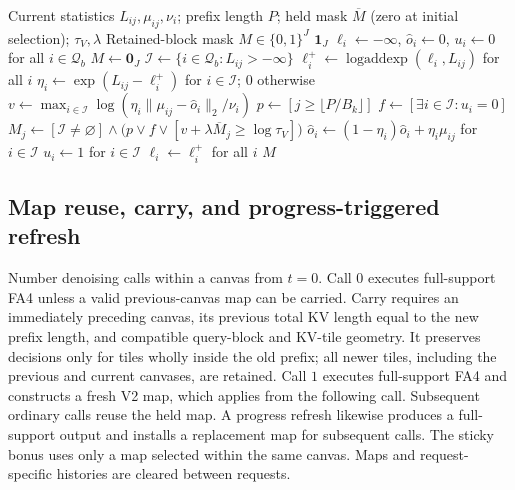 \documentclass[10pt]{article}
\begin{document}
\begin{algorithm}[t]
\caption{V2 selection for one layer, query head, and query block}
\label{alg:v2-selector}
\small
\begin{algorithmic}[1]
\Require Current statistics $L_{ij},\mu_{ij},\nu_i$; prefix length $P$;
held mask $\overline M$ (zero at initial selection); $\tau_V,\lambda$
\Ensure Retained-block mask $M\in\{0,1\}^{J}$
    \State \Return $\boldsymbol 1_J$ 
\EndIf
\State $\ell_i\gets-\infty$, $\widehat o_i\gets0$, $u_i\gets0$ for all $i\in\mathcal Q_b$
\State $M\gets\boldsymbol 0_J$
    \State $\mathcal I\gets\{i\in\mathcal Q_b:L_{ij}>-\infty\}$
    \State $\ell_i^+\gets\operatorname{logaddexp}(\ell_i,L_{ij})$ for all $i$
    \State $\eta_i\gets\exp(L_{ij}-\ell_i^+)$ for $i\in\mathcal I$; $0$ otherwise
    \State $v\gets\displaystyle\max_{i\in\mathcal I}
        \log\!\left(\eta_i\|\mu_{ij}-\widehat o_i\|_2/\nu_i\right)$
        \Comment{$\max\varnothing=-\infty$}
    \State $p\gets[j\ge\lfloor P/B_k\rfloor]$
    \State $f\gets[\exists i\in\mathcal I:u_i=0]$
    \State $M_j\gets[\mathcal I\ne\varnothing]\land
        \bigl(p\lor f\lor[v+\lambda\overline M_j\ge\log\tau_V]\bigr)$
        \State $\widehat o_i\gets(1-\eta_i)\widehat o_i+\eta_i\mu_{ij}$ for $i\in\mathcal I$
        \State $u_i\gets1$ for $i\in\mathcal I$
    \EndIf
    \State $\ell_i\gets\ell_i^+$ for all $i$ 
\EndFor
\State \Return $M$
\end{algorithmic}
\end{algorithm}

\subsection{Map reuse, carry, and progress-triggered refresh}
\label{sec:v2-reuse}

Number denoising calls within a canvas from $t=0$. Call $0$ executes
full-support FA4 unless a valid previous-canvas map can be carried. Carry
requires an immediately preceding canvas, its previous total KV length
equal to the new prefix length, and compatible query-block and KV-tile
geometry. It preserves decisions only for tiles wholly inside the old
prefix; all newer tiles, including the previous and current canvases, are
retained. Call $1$ executes full-support FA4 and constructs a fresh V2 map,
which applies from the following call. Subsequent ordinary calls reuse the
held map. A progress refresh likewise produces a full-support output and
installs a replacement map for subsequent calls. The sticky bonus uses
only a map selected within the same canvas. Maps and request-specific
histories are cleared between requests.
\end{document}
